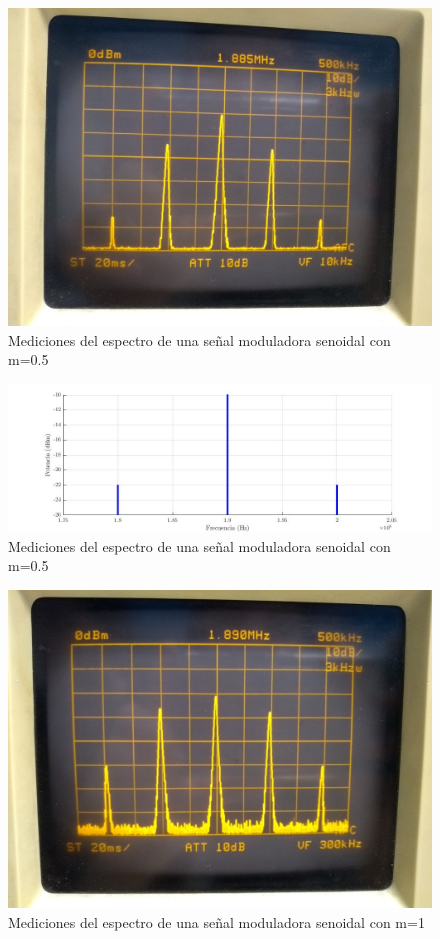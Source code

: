 \documentclass[../../labo_tp5_main.tex]{subfiles}
\begin{document}
\begin{figure}[H]	
	\centering
	\includegraphics[scale=0.05]{imagenes/labo_tp5_ej3_a_1.jpg}
	\caption{Mediciones del espectro de una señal moduladora senoidal con m=0.5}
	\label{fig:ej1_labo_tp5_ej3_a_1}
\end{figure}
\begin{figure}[H]	
	\centering
	\includegraphics[scale=0.5]{imagenes/labo_tp5_ej3a.jpg}
	\caption{Mediciones del espectro de una señal moduladora senoidal con m=0.5}
	\label{fig:ej1_labo_tp5_ej3_a_1}
\end{figure}
\begin{figure}[H]	
	\centering
	\includegraphics[scale=0.05]{imagenes/labo_tp5_ej3_b.jpg}
	\caption{Mediciones del espectro de una señal moduladora senoidal con m=1}
	\label{fig:ej1_labo_tp5_ej3_b}
\end{figure}
\end{document}
